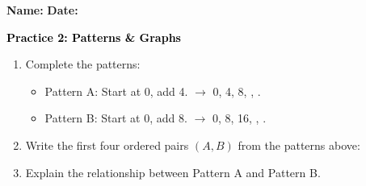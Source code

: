 \documentclass[12pt, letterpaper, fleqn]{article}
\newcommand{\blank}{\underline{\hspace{2.2cm}}}
\newcommand{\blanklong}{\underline{\hspace{6.5cm}}}
\begin{document}
\textbf{Name:} \underline{\hspace{5cm}}
\hfill
\textbf{Date:} \underline{\hspace{3cm}}\\

\begin{tcolorbox}[colback=customteal!20]
    \large\textcolor{black}{\textbf{Practice 2: Patterns \& Graphs}}
\end{tcolorbox}
\begin{enumerate}[itemsep=3.5cm, leftmargin=0.6cm]
\item Complete the patterns:
  \begin{itemize}
    \item Pattern A: Start at 0, add 4. $\rightarrow$ 0, 4, 8, \blank, \blank.
    \item Pattern B: Start at 0, add 8. $\rightarrow$ 0, 8, 16, \blank, \blank.
  \end{itemize}
\item Write the first four ordered pairs $(A, B)$ from the patterns above:
\\
\blanklong
\item Explain the relationship between Pattern A and Pattern B.
\end{enumerate}
\end{document}
